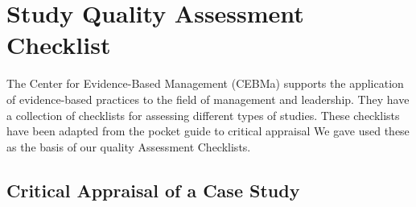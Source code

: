 
\chapter{Study Quality Assessment Checklist} 
\label{appendix:QualityAssesmentChecklist} 
The Center for Evidence-Based Management (CEBMa) supports the application of evidence-based practices to the field of management and leadership.
They have a collection of checklists for assessing different types of studies. 
These checklists have been adapted from the pocket guide to critical appraisal \cite{crombie1997pocket}
We gave used these as the basis of our quality Assessment Checklists.

\section{Critical Appraisal of a Case Study}


